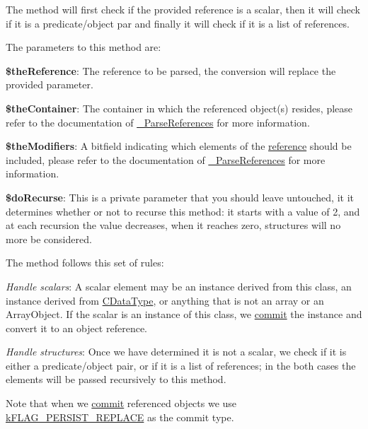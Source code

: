 The method will first check if the provided reference is a scalar, then it will check if it is a predicate/object par and finally it will check if it is a list of references.

The parameters to this method are\-:


\begin{DoxyItemize}
\item {\bfseries \$the\-Reference}\-: The reference to be parsed, the conversion will replace the provided parameter. 
\item {\bfseries \$the\-Container}\-: The container in which the referenced object(s) resides, please refer to the documentation of \hyperlink{class_c_persistent_unit_object_ae74127a9fb936d8cf5aeed30315ac05b}{\-\_\-\-Parse\-References} for more information. 
\item {\bfseries \$the\-Modifiers}\-: A bitfield indicating which elements of the \hyperlink{class_c_container_a1486a3cb34d24ff1c3028ad4360b5dc6}{reference} should be included, please refer to the documentation of \hyperlink{class_c_persistent_unit_object_ae74127a9fb936d8cf5aeed30315ac05b}{\-\_\-\-Parse\-References} for more information. 
\item {\bfseries \$do\-Recurse}\-: This is a private parameter that you should leave untouched, it it determines whether or not to recurse this method\-: it starts with a value of 2, and at each recursion the value decreases, when it reaches zero, structures will no more be considered. 
\end{DoxyItemize}

The method follows this set of rules\-:


\begin{DoxyItemize}
\item {\itshape Handle scalars}\-: A scalar element may be an instance derived from this class, an instance derived from \hyperlink{class_c_data_type}{C\-Data\-Type}, or anything that is not an array or an Array\-Object. If the scalar is an instance of this class, we \hyperlink{class_c_persistent_object_a88b1f2b11d3d60e0b3d33d8b0649b68a}{commit} the instance and convert it to an object reference. 
\item {\itshape Handle structures}\-: Once we have determined it is not a scalar, we check if it is either a predicate/object pair, or if it is a list of references; in the both cases the elements will be passed recursively to this method. 
\end{DoxyItemize}

Note that when we \hyperlink{class_c_persistent_object_a88b1f2b11d3d60e0b3d33d8b0649b68a}{commit} referenced objects we use \hyperlink{}{k\-F\-L\-A\-G\-\_\-\-P\-E\-R\-S\-I\-S\-T\-\_\-\-R\-E\-P\-L\-A\-C\-E} as the commit type.

